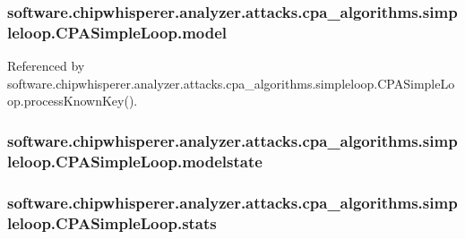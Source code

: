 \subsubsection[{model}]{\setlength{\rightskip}{0pt plus 5cm}software.\+chipwhisperer.\+analyzer.\+attacks.\+cpa\+\_\+algorithms.\+simpleloop.\+C\+P\+A\+Simple\+Loop.\+model}\label{classsoftware_1_1chipwhisperer_1_1analyzer_1_1attacks_1_1cpa__algorithms_1_1simpleloop_1_1CPASimpleLoop_a450751e7ecb40c5131d3ccf548ccddcb}


Referenced by software.\+chipwhisperer.\+analyzer.\+attacks.\+cpa\+\_\+algorithms.\+simpleloop.\+C\+P\+A\+Simple\+Loop.\+process\+Known\+Key().

\hypertarget{classsoftware_1_1chipwhisperer_1_1analyzer_1_1attacks_1_1cpa__algorithms_1_1simpleloop_1_1CPASimpleLoop_af6838053fcedfe40e2d7ef2966a9eae2}{}
\subsubsection[{modelstate}]{\setlength{\rightskip}{0pt plus 5cm}software.\+chipwhisperer.\+analyzer.\+attacks.\+cpa\+\_\+algorithms.\+simpleloop.\+C\+P\+A\+Simple\+Loop.\+modelstate}\label{classsoftware_1_1chipwhisperer_1_1analyzer_1_1attacks_1_1cpa__algorithms_1_1simpleloop_1_1CPASimpleLoop_af6838053fcedfe40e2d7ef2966a9eae2}
\hypertarget{classsoftware_1_1chipwhisperer_1_1analyzer_1_1attacks_1_1cpa__algorithms_1_1simpleloop_1_1CPASimpleLoop_a4b9c6b25dc19a66d34ef97e166ccd5ac}{}
\subsubsection[{stats}]{\setlength{\rightskip}{0pt plus 5cm}software.\+chipwhisperer.\+analyzer.\+attacks.\+cpa\+\_\+algorithms.\+simpleloop.\+C\+P\+A\+Simple\+Loop.\+stats}\label{classsoftware_1_1chipwhisperer_1_1analyzer_1_1attacks_1_1cpa__algorithms_1_1simpleloop_1_1CPASimpleLoop_a4b9c6b25dc19a66d34ef97e166ccd5ac}



